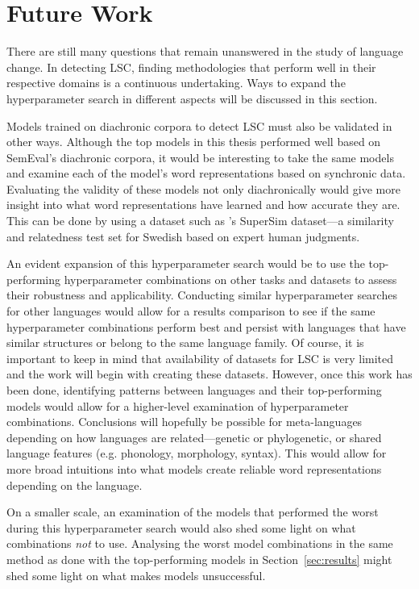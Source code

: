 \section{Future Work}
\label{sec:futurework}

There are still many questions that remain unanswered in the study of language change. In detecting LSC, finding methodologies that perform well in their respective domains is a continuous undertaking. Ways to expand the hyperparameter search in different aspects will be discussed in this section.

Models trained on diachronic corpora to detect LSC must also be validated in other ways. Although the top models in this thesis performed well based on SemEval’s diachronic corpora, it would be interesting to take the same models and examine each of the model’s word representations based on synchronic data. Evaluating the validity of these models not only diachronically would give more insight into what word representations have learned and how accurate they are. This can be done by using a dataset such as \citet{supersim2021}'s SuperSim dataset—a similarity and relatedness test set for Swedish based on expert human judgments. 

An evident expansion of this hyperparameter search would be to use the top-performing hyperparameter combinations on other tasks and datasets to assess their robustness and applicability. Conducting similar hyperparameter searches for other languages would allow for a results comparison to see if the same hyperparameter combinations perform best and persist with languages that have similar structures or belong to the same language family. Of course, it is important to keep in mind that availability of datasets for LSC is very limited and the work will begin with creating these datasets. However, once this work has been done, identifying patterns between languages and their top-performing models would allow for a higher-level examination of hyperparameter combinations. Conclusions will hopefully be possible for meta-languages depending on how languages are related—genetic or phylogenetic, or shared language features (e.g. phonology, morphology, syntax). This would allow for more broad intuitions into what models create reliable word representations depending on the language.

On a smaller scale, an examination of the models that performed the worst during this hyperparameter search would also shed some light on what combinations \emph{not} to use. Analysing the worst model combinations in the same method as done with the top-performing models in Section~\ref{sec:results} might shed some light on what makes models unsuccessful. 

